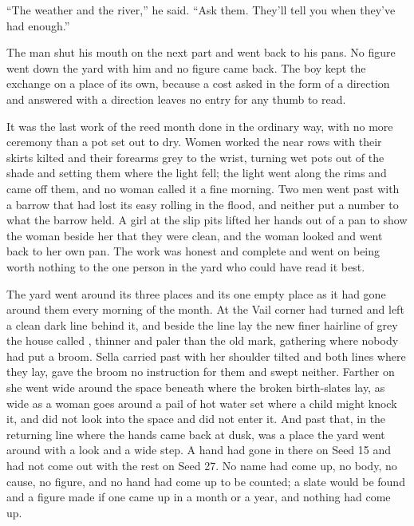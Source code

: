 “The weather and the river,” he said. “Ask them. They’ll tell you when they’ve had enough.”

The man shut his mouth on the next part and went back to his pans. No figure went down the yard with him and no figure came back. The boy kept the exchange on a place of its own, because a cost asked in the form of a direction and answered with a direction leaves no entry for any thumb to read.

It was the last work of the reed month done in the ordinary way, with no more ceremony than a pot set out to dry. Women worked the near rows with their skirts kilted and their forearms grey to the wrist, turning wet pots out of the shade and setting them where the light fell; the light went along the rims and came off them, and no woman called it a fine morning. Two men went past with a barrow that had lost its easy rolling in the flood, and neither put a number to what the barrow held. A girl at the slip pits lifted her hands out of a pan to show the woman beside her that they were clean, and the woman looked and went back to her own pan. The work was honest and complete and went on being worth nothing to the one person in the yard who could have read it best.

The yard went around its three places and its one empty place as it had gone around them every morning of the month. At the Vail corner  had turned and left a clean dark line behind it, and beside the line lay the new finer hairline of grey the house called , thinner and paler than the old mark, gathering where nobody had put a broom. Sella carried past with her shoulder tilted and both lines where they lay, gave the broom no instruction for them and swept neither. Farther on she went wide around the space beneath  where the broken birth-slates lay, as wide as a woman goes around a pail of hot water set where a child might knock it, and did not look into the space and did not enter it. And past that, in the returning line where the hands came back at dusk, was a place the yard went around with a look and a wide step. A hand had gone in there on Seed 15 and had not come out with the rest on Seed 27. No name had come up, no body, no cause, no figure, and no hand had come up to be counted; a slate would be found and a figure made if one came up in a month or a year, and nothing had come up.

